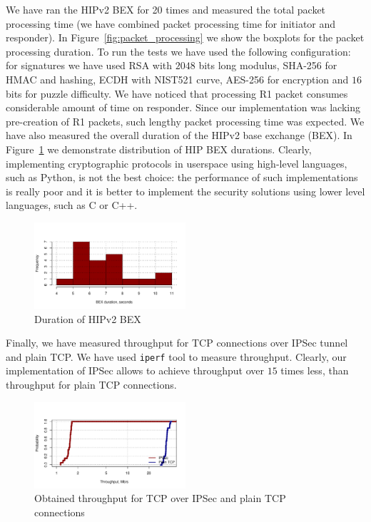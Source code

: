 We have ran the HIPv2 BEX for 20 times and measured the total packet processing time (we have combined packet 
processing time for initiator and responder). In Figure~\ref{fig:packet_processing} we show the boxplots for 
the packet processing duration. To run the tests we have used the following configuration: for signatures 
we have used RSA with $2048$ bits long modulus, SHA-256 for HMAC and hashing, ECDH with NIST521 curve, 
AES-256 for encryption and $16$ bits for puzzle difficulty. We have noticed that processing R1 packet consumes considerable
amount of time on responder. Since our implementation was lacking pre-creation of R1 packets, such lengthy packet 
processing time was expected. We have also measured the overall duration of the HIPv2 base exchange (BEX). 
In Figure~\ref{fig:duration_bex} we demonstrate distribution of HIP BEX durations. Clearly, implementing 
cryptographic protocols in userspace using high-level languages, such as Python, is not the best choice: the performance
of such implementations is really poor and it is better to implement the security solutions using lower 
level languages, such as C or C++.

\begin{figure}
	\includegraphics[width=0.5\textwidth]{graphics/duration_bex.pdf}
	\caption{Duration of HIPv2 BEX}
	\label{fig:duration_bex}
\end{figure}

Finally, we have measured throughput for TCP connections over IPSec tunnel and plain TCP. We have used
\texttt{iperf} tool to measure throughput. Clearly, our implementation of IPSec allows to achieve
throughput over $15$ times less, than throughput for plain TCP connections.

\begin{figure}
	\includegraphics[width=0.5\textwidth]{graphics/throughput.pdf}
	\caption{Obtained throughput for TCP over IPSec and plain TCP connections}
	\label{fig:throughput}
\end{figure}
